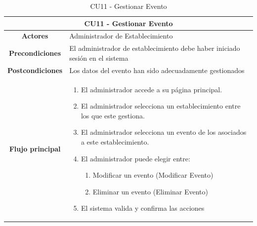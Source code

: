 \begin{table}[h]
    \centering
    \begin{tabular}{|c|p{10cm}|}
        \hline
        \multicolumn{2}{|c|}{\textbf{CU11 - Gestionar Evento}}                                                         \\
        \hline
        \textbf{Actores}         & Administrador de Establecimiento                                                    \\
        \hline
        \textbf{Precondiciones}  & El administrador de establecimiento debe haber iniciado sesión en el sistema        \\
        \hline
        \textbf{Postcondiciones} & Los datos del evento han sido adecuadamente gestionados                             \\
        \hline
        \textbf{Flujo principal} & \begin{enumerate}
                                       \item El administrador accede a su página principal.
                                       \item El administrador selecciona un establecimiento entre los que este gestiona.
                                       \item El administrador selecciona un evento de los asociados a este establecimiento.
                                       \item El administrador puede elegir entre:
                                             \begin{enumerate}
                      \item Modificar un evento (Modificar Evento)
                      \item Eliminar un evento (Eliminar Evento)
                  \end{enumerate}
                                       \item El sistema valida y confirma las acciones

                                   \end{enumerate} \\
        \hline
    \end{tabular}
    \caption{CU11 - Gestionar Evento }
\end{table}

